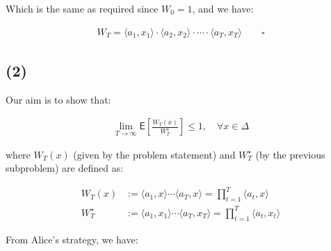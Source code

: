 \documentclass{article}
\begin{document}
Which is the same as required since $W_0 = 1$, and we have:

\begin{align*}
    W_T = \langle a_1, x_1 \rangle \cdot \langle a_2, x_2 \rangle \cdot \cdots \cdot \langle a_T, x_T \rangle \qquad \square
\end{align*}

\subsection*{(2)}

Our aim is to show that:

\begin{align*}
    \lim_{T \to \infty} \mathsf{E} \left[ \frac{W_T (x)}{W_T^\star} \right] \leq 1 ,  \quad \forall x \in \Delta \tag{*}
\end{align*}

where $W_T (x)$ (given by the problem statement) and $W_T^\star$ (by the previous subproblem) are defined as:

\begin{align*}
    W_T (x) &:= \langle a_1, x \rangle \cdots \langle a_T, x \rangle = \prod_{t = 1}^T \langle a_t, x \rangle \\
    W_T^\star &:= \langle a_1, x_1 \rangle \cdots \langle a_T, x_T \rangle = \prod_{t = 1}^T \langle a_t, x_t \rangle
\end{align*}

\begin{comment}
Taking $\log$ on both sides of $(*)$, we have:

\begin{align*}
    &\lim_{T \to \infty} \log \left( \mathsf{E} \left[ \frac{W_T (x)}{W_T^\star} \right] \right) \leq 0 ,  \quad \forall x \in \Delta \\
    \Rightarrow \ &\lim_{T \to \infty} \log \left( \frac{\mathsf{E} [W_T (x)]}{\mathsf{E} [W_T^\star]} \right) \leq 0 ,  \quad \forall x \in \Delta \\
    \Rightarrow \ &\lim_{T \to \infty} \log \left( \mathsf{E} [W_T (x)]\right) - \log \left(\mathsf{E} [W_T^\star] \right) \leq 0 ,  \quad \forall x \in \Delta \\
    \Rightarrow \ &\lim_{T \to \infty} \mathsf{E} \left[ \log (W_T (x)) \right] - \mathsf{E} \left[ \log (W_T^\star) \right] \leq 0 ,  \quad \forall x \in \Delta \\
    \Rightarrow \ &\lim_{T \to \infty} \mathsf{E} \left[ \log (\prod_{t = 1}^T \langle a_t, x \rangle)\right] - \mathsf{E} \left[ \log (\prod_{t = 1}^T \langle a_t, x_t \rangle) \right] \leq 0 ,  \quad \forall x \in \Delta \\
    \Rightarrow \ &\lim_{T \to \infty} \mathsf{E} \left[ \sum_{t = 1}^T \log \langle a_t, x \rangle\right] - \mathsf{E} \left[ \sum_{t = 1}^T \log \langle a_t, x_t \rangle \right] \leq 0 ,  \quad \forall x \in \Delta \\
    \Rightarrow \ &\lim_{T \to \infty} \mathsf{E} \left[ \sum_{t = 1}^T \left( \log \langle a_t, x \rangle - \log \langle a_t, x_t \rangle \right) \right] \leq 0 ,  \quad \forall x \in \Delta \tag{1}
\end{align*}
\end{comment}
From Alice's strategy, we have:
\end{document}
